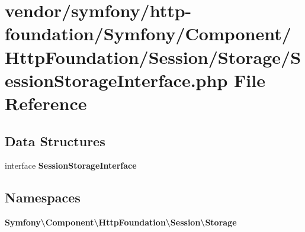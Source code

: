 \section{vendor/symfony/http-\/foundation/\+Symfony/\+Component/\+Http\+Foundation/\+Session/\+Storage/\+Session\+Storage\+Interface.php File Reference}
\label{_session_storage_interface_8php}
\subsection*{Data Structures}
\begin{DoxyCompactItemize}
\item 
interface {\bf Session\+Storage\+Interface}
\end{DoxyCompactItemize}
\subsection*{Namespaces}
\begin{DoxyCompactItemize}
\item 
 {\bf Symfony\textbackslash{}\+Component\textbackslash{}\+Http\+Foundation\textbackslash{}\+Session\textbackslash{}\+Storage}
\end{DoxyCompactItemize}
